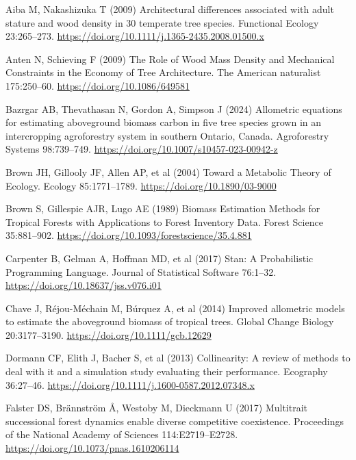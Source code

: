 \documentclass[
  12pt,
  letterpaper,
  DIV=11,
  numbers=noendperiod]{scrartcl}
\newlength{\cslhangindent}
\newenvironment{CSLReferences}[2] %
 {\begin{list}{}{%
  \setlength{\itemindent}{0pt}
  \setlength{\leftmargin}{0pt}
  \setlength{\parsep}{0pt}
  \ifodd #1
   \setlength{\leftmargin}{\cslhangindent}
   \setlength{\itemindent}{-1\cslhangindent}
  \fi
  \setlength{\itemsep}{#2\baselineskip}}}
 {\end{list}}
\begin{document}
\label{refs}
\begin{CSLReferences}{1}{1}
Aiba M, Nakashizuka T (2009) Architectural differences associated with
adult stature and wood density in 30 temperate tree species. Functional
Ecology 23:265--273.
\url{https://doi.org/10.1111/j.1365-2435.2008.01500.x}

Anten N, Schieving F (2009) The {Role} of {Wood} {Mass} {Density} and
{Mechanical} {Constraints} in the {Economy} of {Tree} {Architecture}.
The American naturalist 175:250--60.
\url{https://doi.org/10.1086/649581}

Bazrgar AB, Thevathasan N, Gordon A, Simpson J (2024) Allometric
equations for estimating aboveground biomass carbon in five tree species
grown in an intercropping agroforestry system in southern {Ontario},
{Canada}. Agroforestry Systems 98:739--749.
\url{https://doi.org/10.1007/s10457-023-00942-z}

Brown JH, Gillooly JF, Allen AP, et al (2004) Toward a {Metabolic}
{Theory} of {Ecology}. Ecology 85:1771--1789.
\url{https://doi.org/10.1890/03-9000}

Brown S, Gillespie AJR, Lugo AE (1989) Biomass {Estimation} {Methods}
for {Tropical} {Forests} with {Applications} to {Forest} {Inventory}
{Data}. Forest Science 35:881--902.
\url{https://doi.org/10.1093/forestscience/35.4.881}

Carpenter B, Gelman A, Hoffman MD, et al (2017) Stan: {A}
{Probabilistic} {Programming} {Language}. Journal of Statistical
Software 76:1--32. \url{https://doi.org/10.18637/jss.v076.i01}

Chave J, Réjou-Méchain M, Búrquez A, et al (2014) Improved allometric
models to estimate the aboveground biomass of tropical trees. Global
Change Biology 20:3177--3190. \url{https://doi.org/10.1111/gcb.12629}

Dormann CF, Elith J, Bacher S, et al (2013) Collinearity: A review of
methods to deal with it and a simulation study evaluating their
performance. Ecography 36:27--46.
\url{https://doi.org/10.1111/j.1600-0587.2012.07348.x}

Falster DS, Brännström Å, Westoby M, Dieckmann U (2017) Multitrait
successional forest dynamics enable diverse competitive coexistence.
Proceedings of the National Academy of Sciences 114:E2719--E2728.
\url{https://doi.org/10.1073/pnas.1610206114}


\end{CSLReferences}
\end{document}
